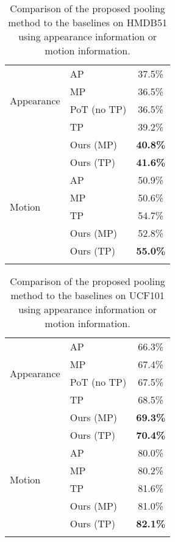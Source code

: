 \documentclass[journal]{IEEEtran}
\begin{document}
\begin{table}[t!]\normalsize
\caption{Comparison of the proposed pooling method to the baselines on HMDB51 using appearance information or motion information.}
  \centering
  \renewcommand{\arraystretch}{1.2}
    \begin{tabular}{l|p{2.6cm}c}
    \hline
    \multirow{4}{*}{Appearance} & AP & 37.5\% \\
    & MP & 36.5\% \\
    & PoT (no TP) \cite{Ryoo_2015_CVPR} & 36.5\% \\
    & TP & 39.2\% \\
    & Ours (MP) & \textbf{40.8\%} \\
    & Ours (TP) & \textbf{41.6\%}
    \\ \hline \hline
	\multirow{4}{*}{ Motion} & AP & 50.9\% \\
	& MP & 50.6\% \\
    & TP & 54.7\% \\
    & Ours (MP) & 52.8\% \\
    & Ours (TP) & \textbf{55.0\%} \\
    \hline \noalign{\smallskip}
    \end{tabular}%
%

  \label{baselinetab:HMDB51}%
\end{table}%



\begin{table}[t!]\normalsize
\caption{Comparison of the proposed pooling method to the baselines on UCF101 using appearance information or motion information.}
  \centering
  \renewcommand{\arraystretch}{1.2}
    \begin{tabular}{l|p{2.6cm}c}
    \hline
    \multirow{4}{*}{Appearance} & AP & 66.3\% \\
    & MP & 67.4\% \\
    & PoT (no TP) \cite{Ryoo_2015_CVPR} & 67.5\% \\
    & TP & 68.5\% \\
    & Ours (MP) & \textbf{69.3\%} \\
    & Ours (TP) & \textbf{70.4\%}
    \\ \hline \hline
	\multirow{4}{*}{ Motion} & AP & 80.0\% \\
	& MP & 80.2\% \\
    & TP & 81.6\% \\
    & Ours (MP) & 81.0\% \\
    & Ours (TP) & \textbf{82.1\%} \\
    \hline \noalign{\smallskip}
    \end{tabular}%
%

  \label{baselinetab:UCF101}%
\end{table}%
\end{document}
